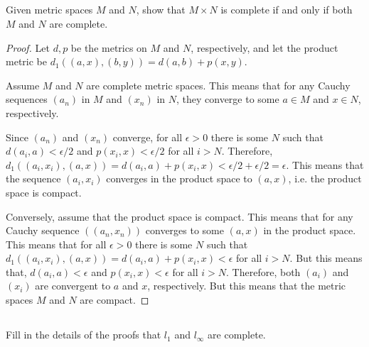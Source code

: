 \subsection{} Given metric spaces $M$ and $N$, show that $M \times N$ is complete if and only if both $M$ and $N$ are complete. 

\begin{proof}
Let $d,p$ be the metrics on $M$ and $N$, respectively, and let the product metric be $d_1((a,x), (b,y)) = d(a,b) + p(x,y)$.

Assume $M$ and $N$ are complete metric spaces. This means that for any Cauchy sequences $(a_n)$ in $M$ and $(x_n)$ in $N$, they converge to some $a \in M$ and $x \in N$, respectively.

Since $(a_n)$ and $(x_n)$ converge, for all $\epsilon > 0$ there is some $N$ such that $d(a_i, a) < \epsilon/2$ and $p(x_i, x) < \epsilon / 2$ for all $i>N$. Therefore, $d_1((a_i, x_i), (a,x)) = d(a_i, a) + p(x_i, x) < \epsilon/2 + \epsilon/2 = \epsilon$. This means that the sequence $(a_i, x_i)$ converges in the product space to $(a,x)$, i.e. the product space is compact.

\vspace{1em}

Conversely, assume that the product space is compact. This means that for any Cauchy sequence $((a_n, x_n))$ converges to some $(a,x)$ in the product space. This means that for all $\epsilon>0$ there is some $N$ such that $d_1((a_i, x_i), (a,x)) = d(a_i, a) + p(x_i, x) < \epsilon$ for all $i > N$. But this means that, $d(a_i, a) < \epsilon$ and $p(x_i, x) < \epsilon$ for all $i > N$. Therefore, both $(a_i)$ and $(x_i)$ are convergent to $a$ and $x$, respectively. But this means that the metric spaces $M$ and $N$ are compact.

\end{proof}

\newpage

\subsection{} Fill in the details of the proofs that $l_1$ and $l_\infty$ are complete.

